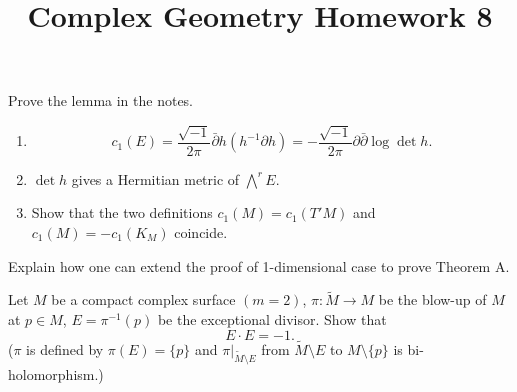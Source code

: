 \documentclass[12pt]{article}
\title{Complex Geometry Homework 8}
\author{}
\date{}
\begin{document}
\maketitle
\begin{problem}
  Prove the lemma in the notes.
  \begin{enumerate}[(1)]
  \item \[
      c_1(E)=\frac{\sqrt{-1}}{2\pi}\bar{\partial}h(h^{-1}\partial h)
      =-\frac{\sqrt{-1}}{2\pi}\partial\bar{\partial}\log\det h
    .\] 
  \item \(\det h\) gives a Hermitian metric of \(\bigwedge^r E\).
  \item Show that the two definitions \(c_1(M)=c_1(T'M)\) and \(c_1(M)=-c_1(K_M)\)
    coincide.
  \end{enumerate}
\end{problem}
\begin{problem}
  Explain how one can extend the proof of 1-dimensional case to prove Theorem A.
\end{problem}
\begin{problem}
  Let \(M\) be a compact complex surface \((m=2)\), \(\pi\colon \tilde{M}\to M\) be
  the blow-up of \(M\) at \(p\in M\), \(E=\pi^{-1}(p)\) be the exceptional divisor.
  Show that \[
    E\cdot E=-1.
  \] (\(\pi\) is defined by \(\pi(E)=\{p\}\) and \(\pi\Big|_{\tilde{M}\setminus E}\)
  from \(\tilde{M}\setminus E\) to \(M\setminus\{p\}\) is bi-holomorphism.)
\end{problem}
\end{document}
